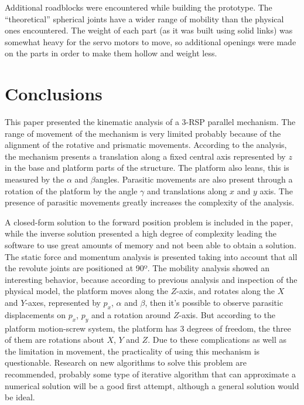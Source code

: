 \documentclass[titlepage, letterpaper]{article}
\begin{document}
Additional roadblocks were encountered while building the prototype.
The ``theoretical'' spherical joints have a wider range of mobility than the physical ones encountered.
The weight of each part (as it was built using solid links) was somewhat heavy for the servo motors to move, so additional openings were made on the parts in order to make them hollow and weight less.

\section{Conclusions}
\label{sec:conc}

This paper presented the kinematic analysis of a 3-RSP parallel mechanism.
The range of movement of the mechanism is very limited probably because of the alignment of the rotative and prismatic movements.
According to the analysis, the mechanism presents a translation along a fixed central axis represented by $z$ in the base and platform parts of the structure.
The platform also leans, this is measured by the $\alpha$ and $\beta$angles.
Parasitic movements are also present through a rotation of the platform by the angle  $\gamma$ and translations along $x$ and $y$ axis.
The presence of parasitic movements greatly increases the complexity of the analysis.

A closed-form solution to the forward position problem is included in the paper, while the inverse solution presented a high degree of complexity leading the software to use great amounts of memory and not been able to obtain a solution.
The static force and momentum analysis is presented taking into account that all the revolute joints are positioned at 90º.
The mobility analysis showed an interesting behavior, because according to previous analysis and inspection of the physical model, the platform moves along the $Z$-axis, and rotates along the $X$ and $Y$-axes, represented by $p_x$, $\alpha$ and $\beta$, then it's possible to observe parasitic displacements on $p_x$, $p_y$ and a rotation around $Z$-axis.
But according to the platform motion-screw system, the platform has 3 degrees of freedom, the three of them are rotations about $X$, $Y$ and $Z$.
Due to these complications as well as the limitation in movement, the practicality of using this mechanism is questionable.
Research on new algorithms to solve this problem are recommended, probably some type of iterative algorithm that can approximate a numerical solution will be a good first attempt, although a general solution would be ideal.



\end{document}
